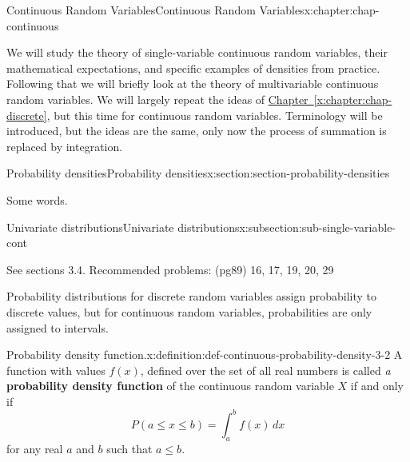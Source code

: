 \documentclass[oneside,10pt,]{book}
\newcommand{\xreffont}{\relax}
\newcommand{\terminology}[1]{\textbf{#1}}
\begin{document}
\begin{chapterptx}{Continuous Random Variables}{}{Continuous Random Variables}{}{}{x:chapter:chap-continuous}
\begin{introduction}{}%
We will study the theory of single-variable continuous random variables, their mathematical expectations, and specific examples of densities from practice.  Following that we will briefly look at the theory of multivariable continuous random variables. We will largely repeat the ideas of \hyperref[x:chapter:chap-discrete]{Chapter~{\xreffont\ref{x:chapter:chap-discrete}}}, but this time for continuous random variables.  Terminology will be introduced, but the ideas are the same, only now the process of summation is replaced by integration.%
\end{introduction}%
%
%
\typeout{************************************************}
\typeout{************************************************}
%
\begin{sectionptx}{Probability densities}{}{Probability densities}{}{}{x:section:section-probability-densities}
\begin{introduction}{}%
Some words.%
\end{introduction}%
%
%
\typeout{************************************************}
\typeout{************************************************}
%
\begin{subsectionptx}{Univariate distributions}{}{Univariate distributions}{}{}{x:subsection:sub-single-variable-cont}
\begin{introduction}{}%
See sections 3.4. Recommended problems: (pg89) 16, 17, 19, 20, 29\textasteriskcentered{}%
\par
Probability distributions for discrete random variables assign probability to discrete values, but for continuous random variables, probabilities are only assigned to intervals.%
\end{introduction}%
\begin{definition}{Probability density function.}{x:definition:def-continuous-probability-density-3-2}%
A function with values \(f(x)\), defined over the set of all real numbers is called \emph{a} \terminology{probability density function} of the continuous random variable \(X\) if and only if%
\begin{equation*}
P(a \le x \le b) = \int_a^b f(x)\,dx
\end{equation*}
for any real \(a\) and \(b\) such that \(a \le b\).%
\end{definition}

\end{subsectionptx}
\end{sectionptx}
\end{chapterptx}
\end{document}
